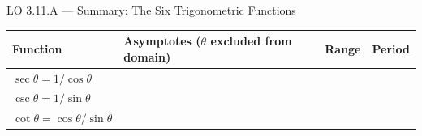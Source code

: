 \documentclass[10pt]{article}
\begin{document}
\vspace{0.08in}

\begin{notesbox}{LO 3.11.A --- Summary: The Six Trigonometric Functions}

\renewcommand{\arraystretch}{1.8}
\begin{tabularx}{\linewidth}{@{} l X X X @{}}
\hline
\textbf{Function} & \textbf{Asymptotes} ($\theta$ excluded from domain) & \textbf{Range} & \textbf{Period} \\
\hline
$\sec\theta = 1/\cos\theta$ & & & \\
$\csc\theta = 1/\sin\theta$ & & & \\
$\cot\theta = \cos\theta/\sin\theta$ & & & \\
\hline
\end{tabularx}

\end{notesbox}

\vspace{0.08in}
\end{document}
